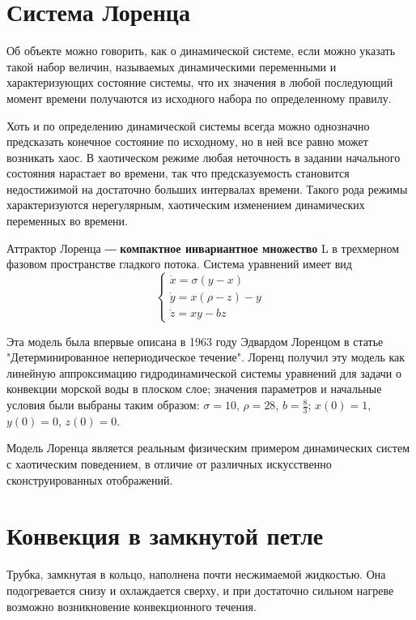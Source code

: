 \documentclass[12pt]{article}
\begin{document}

\newpage

\section{Система Лоренца}
Об объекте можно говорить, как о динамической системе, если можно указать такой набор величин, называемых динамическими переменными и характеризующих состояние системы, что их значения в любой последующий момент времени получаются из исходного набора по определенному правилу.

Хоть и по определению динамической системы всегда можно однозначно предсказать конечное состояние по исходному, но в ней все равно может возникать хаос. В хаотическом режиме любая неточность в задании начального состояния нарастает во времени, так что предсказуемость становится недостижимой на достаточно больших интервалах времени. Такого рода режимы характеризуются нерегулярным, хаотическим изменением динамических переменных во времени.

Аттрактор Лоренца ― \textbf{компактное инвариантное множество} L в трехмерном фазовом пространстве гладкого потока. Система уравнений имеет вид
$$\begin{cases}	
	\dot{x} = \sigma (y-x) \\
	\dot{y} = x(\rho-z)-y \\
	\dot{z} = xy-bz
\end{cases}$$

Эта модель была впервые описана в 1963 году Эдвардом Лоренцом в статье "Детерминированное непериодическое течение". Лоренц получил эту модель как линейную аппроксимацию гидродинамической системы уравнений для задачи о конвекции морской воды в плоском слое; значения параметров и начальные условия были выбраны таким образом: $\sigma = 10$, $\rho = 28$, $b = \frac{8}{3}$; $x(0) = 1$, $y(0) = 0$, $z(0) = 0$.

Модель Лоренца является реальным физическим примером динамических систем с хаотическим поведением, в отличие от различных искусственно сконструированных отображений.

\section{Конвекция в замкнутой петле}

Трубка, замкнутая в кольцо, наполнена почти несжимаемой жидкостью. Она подогревается снизу и охлаждается сверху, и при достаточно сильном нагреве возможно возникновение конвекционного течения.
\end{document}
